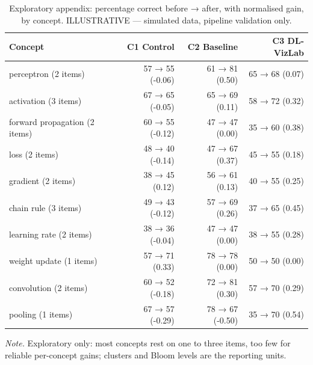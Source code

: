 \begin{table}[htbp]
\centering
\small
\caption{Exploratory appendix: percentage correct before → after, with normalised gain, by concept. ILLUSTRATIVE — simulated data, pipeline validation only.}
\label{tab:T17}
\begin{tabular}{lrrr}
\toprule
Concept & C1 Control & C2 Baseline & C3 DL-VizLab \\
\midrule
perceptron (2 items) & 57 → 55 (-0.06) & 61 → 81 (0.50) & 65 → 68 (0.07) \\
activation (3 items) & 67 → 65 (-0.05) & 65 → 69 (0.11) & 58 → 72 (0.32) \\
forward propagation (2 items) & 60 → 55 (-0.12) & 47 → 47 (0.00) & 35 → 60 (0.38) \\
loss (2 items) & 48 → 40 (-0.14) & 47 → 67 (0.37) & 45 → 55 (0.18) \\
gradient (2 items) & 38 → 45 (0.12) & 56 → 61 (0.13) & 40 → 55 (0.25) \\
chain rule (3 items) & 49 → 43 (-0.12) & 57 → 69 (0.26) & 37 → 65 (0.45) \\
learning rate (2 items) & 38 → 36 (-0.04) & 47 → 47 (0.00) & 38 → 55 (0.28) \\
weight update (1 items) & 57 → 71 (0.33) & 78 → 78 (0.00) & 50 → 50 (0.00) \\
convolution (2 items) & 60 → 52 (-0.18) & 72 → 81 (0.30) & 57 → 70 (0.29) \\
pooling (1 items) & 67 → 57 (-0.29) & 78 → 67 (-0.50) & 35 → 70 (0.54) \\
\bottomrule
\end{tabular}
\par\smallskip\footnotesize\textit{Note.} Exploratory only: most concepts rest on one to three items, too few for reliable per-concept gains; clusters and Bloom levels are the reporting units.
\end{table}
